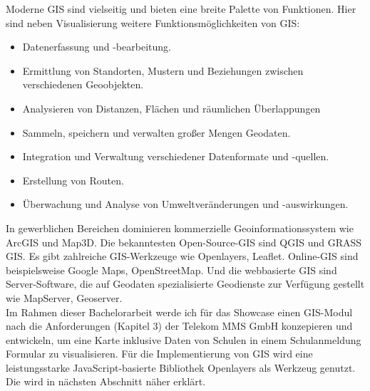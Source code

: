 Moderne GIS sind vielseitig und bieten eine breite Palette von Funktionen. Hier sind neben Visualisierung weitere Funktionsmöglichkeiten von GIS:
\begin{itemize}
    \item Datenerfassung und -bearbeitung.
    \item Ermittlung von Standorten, Mustern und Beziehungen zwischen verschiedenen Geoobjekten.
    \item Analysieren von Distanzen, Flächen und räumlichen Überlappungen
    \item Sammeln, speichern und verwalten großer Mengen Geodaten.
    \item Integration und Verwaltung verschiedener Datenformate und -quellen.
    \item Erstellung von Routen.
    \item Überwachung und Analyse von Umweltveränderungen und -auswirkungen.
\end{itemize}

In gewerblichen Bereichen dominieren kommerzielle Geoinformationssystem wie ArcGIS und Map3D. Die bekanntesten Open-Source-GIS sind QGIS und GRASS GIS. Es gibt zahlreiche GIS-Werkzeuge wie Openlayers, Leaflet. Online-GIS sind beispielsweise Google Maps, OpenStreetMap. Und die webbasierte GIS sind Server-Software, die auf Geodaten spezialisierte Geodienste zur Verfügung gestellt wie MapServer, Geoserver.\\

Im Rahmen dieser Bachelorarbeit werde ich für das Showcase einen GIS-Modul nach die Anforderungen (Kapitel 3) der Telekom MMS GmbH konzepieren und entwickeln, um eine Karte inklusive Daten von Schulen in einem Schulanmeldung Formular zu visualisieren. Für die Implementierung von GIS wird eine leistungsstarke JavaScript-basierte Bibliothek Openlayers als Werkzeug genutzt. Die wird in nächsten Abschnitt näher erklärt.


